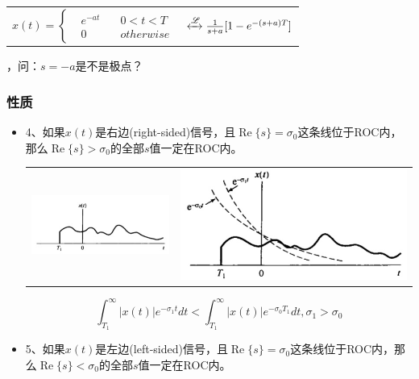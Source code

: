 \documentclass[CJKutf8,dvipsnames,table]{beamer}
\begin{document}
\begin{CJK*}{UTF8}{song}
\begin{frame}
\begin{itemize}
\begin{itemize}
\begin{tabular}{ll}
    \begin{math}
x(t) = 
\left\{
    \begin {aligned}
         & e^{-at} \quad & 0 < t < T \\
         & 0 \quad & otherwise                 
    \end{aligned}
\right.
	\end{math}
&
     $\xleftrightarrow{\mathscr{L}} \frac{1}{s+a}[1-e^{-(s+a)T}]$ 
    \end{tabular}
     ，问：$s=-a$是不是极点？
		\end{itemize}
    \end{itemize}
  \end{frame} 
      
  \begin{frame}
    \frametitle{性质}
    \begin{itemize}
    \item 4、如果$x(t)$是右边(right-sided)信号，且$\operatorname{Re}\{s\}=\sigma_0$这条线位于ROC内，那么$\operatorname{Re}\{s\}>\sigma_0$的全部$s$值一定在ROC内。   
		\begin{tabular}{ll}
		\includegraphics[scale=.45]{ss-c-f9-6}
		&
     	\includegraphics[scale=.3]{ss-c-f9-7}
    	\end{tabular} 
    	\[  
     	\int_{T_1}^{\infty} |x(t)|e^{-\sigma_1 t}dt  < \int_{T_1}^{\infty} |x(t)| e^{-\sigma_0 T_1} dt, \sigma_1 > \sigma_0
    	\]
    \item 5、如果$x(t)$是左边(left-sided)信号，且$\operatorname{Re}\{s\}=\sigma_0$这条线位于ROC内，那么$\operatorname{Re}\{s\}<\sigma_0$的全部$s$值一定在ROC内。   
    \end{itemize}
  \end{frame} 


\end{CJK*}
\end{document}
